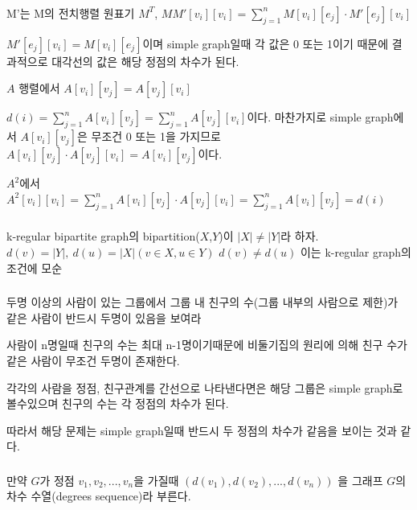 \subsubsection{}
\subsubsection{} 
M'는 M의 전치행렬 원표기 $M^{T}$,
$MM'[v_i][v_i] = \sum_{j=1}^n M[v_i][e_j] \cdot M'[e_j][v_i]$

$ M'[e_j][v_i] = M[v_i][e_j] $이며 simple graph일때 각 값은 0 또는 1이기 때문에 결과적으로 대각선의 값은 해당 정점의 차수가 된다.

$A$ 행렬에서 $A[v_i][v_j] = A[v_j][v_i]$ 

$d(i) = \sum_{j=1}^n A[v_i][v_j] = \sum_{j=1}^n A[v_j][v_i]$이다.
마찬가지로 simple graph에서 $A[v_i][v_j]$은 무조건 0 또는 1을 가지므로 $A[v_i][v_j] \cdot A[v_j][v_i] = A[v_i][v_j]$이다.

$A^2$에서 $A^2[v_i][v_i] = \sum_{j=1}^n A[v_i][v_j] \cdot A[v_j][v_i]= \sum_{j=1}^n A[v_i][v_j] = d(i)$

\subsubsection{} 

k-regular bipartite graph의 bipartition($X$,$Y$)이 $|X|\neq |Y|$라 하자. $d(v)=|Y|,\: d(u)=|X|(v \in X, u \in Y )$ $d(v) \neq d(u)$ 이는 k-regular graph의 조건에 모순

\subsubsection{} 

두명 이상의 사람이 있는 그룹에서 그룹 내 친구의 수(그룹 내부의 사람으로 제한)가 같은 사람이 반드시 두명이 있음을 보여라

사람이 n명일때 친구의 수는 최대 n-1명이기때문에 비둘기집의 원리에 의해 친구 수가 같은 사람이 무조건 두명이 존재한다.

각각의 사람을 정점, 친구관계를 간선으로 나타낸다면은 해당 그룹은 simple graph로 볼수있으며 친구의 수는 각 정점의 차수가 된다.

따라서 해당 문제는 simple graph일때 반드시 두 정점의 차수가 같음을 보이는 것과 같다. 
\subsubsection{} 
만약 $G$가 정점 $v_1, v_2, ... , v_n$을 가질때 $(d(v_1), d(v_2), ... , d(v_n))$ 을 그래프 $G$의 차수 수열(degrees sequence)라 부른다.

